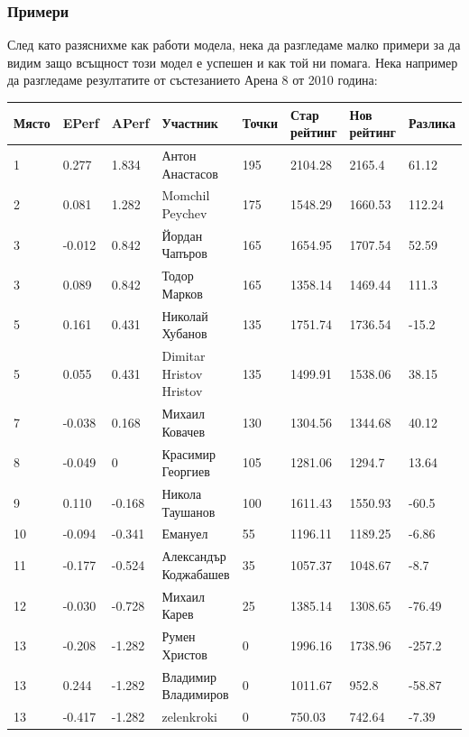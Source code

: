 \documentclass[a4paper,12pt]{article}
\begin{document}
  \subsubsection{Примери}
  След като разяснихме как работи модела, нека да разгледаме малко примери за да видим защо всъщност този модел е успешен и как той ни помага.
  Нека например да разгледаме резултатите от състезанието Арена 8 от 2010 година:
  {\tiny
    \begin{center}
      \begin{tabular}{ | l | l | l | l | l | l | l | l |}
        \hline
        Място & EPerf & APerf & Участник & Точки & Стар рейтинг & Нов рейтинг & Разлика \\ \hline
        1  &  0.277 &  1.834 & Антон Анастасов & 195 & 2104.28 & 2165.4 & 61.12 \\
        2  &  0.081 &  1.282 & Momchil Peychev & 175 & 1548.29 & 1660.53 & 112.24 \\
        3  & -0.012 &  0.842 & Йордан Чапъров & 165 & 1654.95 & 1707.54 & 52.59 \\
        3  &  0.089 &  0.842 & Тодор Марков & 165 & 1358.14 & 1469.44 & 111.3 \\
        5  &  0.161 &  0.431 & Николай Хубанов & 135 & 1751.74 & 1736.54 & -15.2 \\
        5  &  0.055 &  0.431 & Dimitar Hristov Hristov & 135 & 1499.91 & 1538.06 & 38.15 \\
        7  & -0.038 &  0.168 & Михаил Ковачев & 130 & 1304.56 & 1344.68 & 40.12 \\
        8  & -0.049 &  0     & Красимир Георгиев & 105 & 1281.06 & 1294.7 & 13.64 \\
        9  &  0.110 & -0.168 & Никола Таушанов & 100 & 1611.43 & 1550.93 & -60.5 \\
        10 & -0.094 & -0.341 & Емануел & 55 & 1196.11 & 1189.25 & -6.86 \\
        11 & -0.177 & -0.524 & Александър Коджабашев & 35 & 1057.37 & 1048.67 & -8.7 \\
        12 & -0.030 & -0.728 & Михаил Карев & 25 & 1385.14 & 1308.65 & -76.49 \\
        13 & -0.208 & -1.282 & Румен Христов & 0 & 1996.16 & 1738.96 & -257.2 \\
        13 &  0.244 & -1.282 & Владимир Владимиров & 0 & 1011.67 & 952.8 & -58.87 \\
        13 & -0.417 & -1.282 & zelenkroki & 0 & 750.03 & 742.64 & -7.39 \\
        \hline
      \end{tabular}
    \end{center}
  }
  
\end{document}

